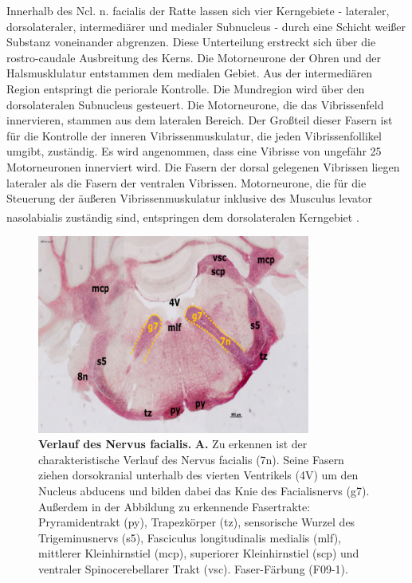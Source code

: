 \documentclass[12pt,a4paper,pdftex]{article}
\begin{document}
Innerhalb des Ncl. n. facialis der Ratte lassen sich vier Kerngebiete - lateraler, dorsolateraler, intermediärer und medialer Subnucleus - durch eine Schicht weißer Substanz voneinander abgrenzen. Diese Unterteilung erstreckt sich über die rostro-caudale Ausbreitung des Kerns. Die Motorneurone der Ohren und der Halsmusklulatur entstammen dem medialen Gebiet. Aus der intermediären Region entspringt die periorale Kontrolle. Die Mundregion wird über den dorsolateralen Subnucleus gesteuert. Die Motorneurone, die das Vibrissenfeld innervieren, stammen aus dem lateralen Bereich. Der Großteil dieser Fasern ist für die Kontrolle der inneren Vibrissenmuskulatur, die jeden Vibrissenfollikel umgibt, zuständig. Es wird angenommen, dass eine Vibrisse von ungefähr 25 Motorneuronen innerviert wird. Die Fasern der dorsal gelegenen Vibrissen liegen lateraler als die Fasern der ventralen Vibrissen. Motorneurone, die für die Steuerung der äußeren Vibrissenmuskulatur inklusive des Musculus levator nasolabialis	zuständig sind, entspringen dem dorsolateralen Kerngebiet \textsuperscript{\cite[11]{paxinos2014rat}}.   


\begin{figure}[H]
    \centering
    \includegraphics[width=0.8\textwidth]{pictures/Bilder_Laura/facialis_Nerv_F09_1png.png}
    \caption[Verlauf des Nervus facialis]{\textbf{Verlauf des Nervus facialis.} \textbf{A.} Zu erkennen ist der charakteristische Verlauf des Nervus facialis (7n). Seine Fasern ziehen dorsokranial unterhalb des vierten Ventrikels (4V) um den Nucleus abducens und bilden dabei das Knie des Facialisnervs (g7). Außerdem in der Abbildung zu erkennende Fasertrakte: Pryramidentrakt (py), Trapezkörper (tz), sensorische Wurzel des Trigeminusnervs (s5), Fasciculus longitudinalis medialis (mlf), mittlerer Kleinhirnstiel (mcp), superiorer Kleinhirnstiel (scp) und ventraler Spinocerebellarer Trakt (vsc). Faser-Färbung (F09-1).}
    \label{fig:nervus-facialis}
\end{figure}
\end{document}
